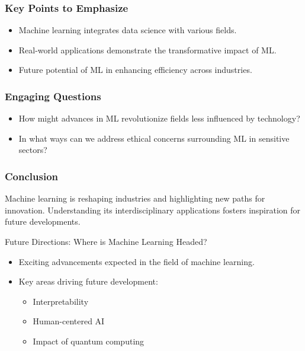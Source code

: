 \documentclass[aspectratio=169]{beamer}
\begin{document}
\begin{frame}[fragile]
    \frametitle{Key Points to Emphasize}
    \begin{itemize}
        \item Machine learning integrates data science with various fields.
        \item Real-world applications demonstrate the transformative impact of ML.
        \item Future potential of ML in enhancing efficiency across industries.
    \end{itemize}
\end{frame}

\begin{frame}[fragile]
    \frametitle{Engaging Questions}
    \begin{itemize}
        \item How might advances in ML revolutionize fields less influenced by technology?
        \item In what ways can we address ethical concerns surrounding ML in sensitive sectors?
    \end{itemize}
\end{frame}

\begin{frame}[fragile]
    \frametitle{Conclusion}
    Machine learning is reshaping industries and highlighting new paths for innovation. Understanding its interdisciplinary applications fosters inspiration for future developments.
\end{frame}

\begin{frame}[fragile]{Future Directions: Where is Machine Learning Headed?}
    \begin{itemize}
        \item Exciting advancements expected in the field of machine learning.
        \item Key areas driving future development:
        \begin{itemize}
            \item Interpretability
            \item Human-centered AI
            \item Impact of quantum computing
        \end{itemize}
    \end{itemize}
\end{frame}
\end{document}
